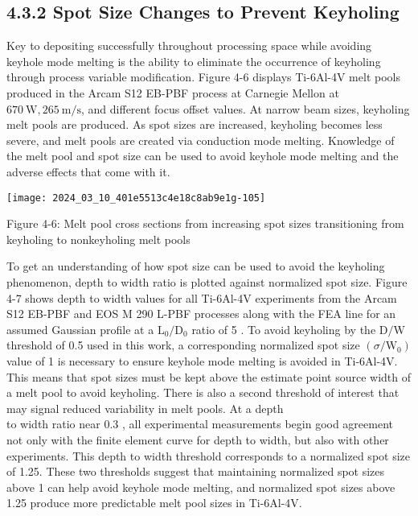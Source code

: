 \documentclass[10pt]{article}
\begin{document}
\subsection*{4.3.2 Spot Size Changes to Prevent Keyholing}
Key to depositing successfully throughout processing space while avoiding keyhole mode melting is the ability to eliminate the occurrence of keyholing through process variable modification. Figure 4-6 displays Ti-6Al-4V melt pools produced in the Arcam S12 EB-PBF process at Carnegie Mellon at $670 \mathrm{~W}, 265 \mathrm{~m} / \mathrm{s}$, and different focus offset values. At narrow beam sizes, keyholing melt pools are produced. As spot sizes are increased, keyholing becomes less severe, and melt pools are created via conduction mode melting. Knowledge of the melt pool and spot size can be used to avoid keyhole mode melting and the adverse effects that come with it.

\begin{center}
\texttt{[image: 2024\_03\_10\_401e5513c4e18c8ab9e1g-105]}
\end{center}

Figure 4-6: Melt pool cross sections from increasing spot sizes transitioning from keyholing to nonkeyholing melt pools

To get an understanding of how spot size can be used to avoid the keyholing phenomenon, depth to width ratio is plotted against normalized spot size. Figure 4-7 shows depth to width values for all Ti-6Al-4V experiments from the Arcam S12 EB-PBF and EOS M 290 L-PBF processes along with the FEA line for an assumed Gaussian profile at a $\mathrm{L}_{0} / \mathrm{D}_{0}$ ratio of 5 . To avoid keyholing by the $\mathrm{D} / \mathrm{W}$ threshold of 0.5 used in this work, a corresponding normalized spot size $\left(\sigma / \mathrm{W}_{0}\right)$ value of 1 is necessary to ensure keyhole mode melting is avoided in Ti-6Al-4V. This means that spot sizes must be kept above the estimate point source width of a melt pool to avoid keyholing. There is also a second threshold of interest that may signal reduced variability in melt pools. At a depth\\
to width ratio near 0.3 , all experimental measurements begin good agreement not only with the finite element curve for depth to width, but also with other experiments. This depth to width threshold corresponds to a normalized spot size of 1.25. These two thresholds suggest that maintaining normalized spot sizes above 1 can help avoid keyhole mode melting, and normalized spot sizes above 1.25 produce more predictable melt pool sizes in Ti-6Al-4V.
\end{document}
